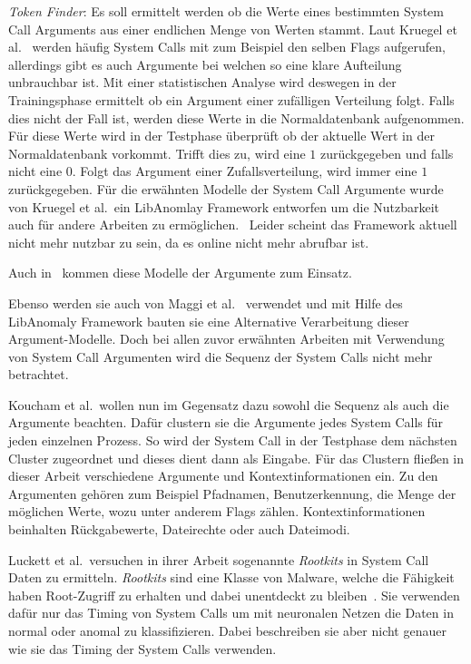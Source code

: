         \textit{Token Finder}: Es soll ermittelt werden ob die Werte eines bestimmten System Call Arguments aus einer endlichen Menge von Werten stammt.
        Laut Kruegel et al.~\cite{ARGUMENTS} werden häufig System Calls mit zum Beispiel den selben Flags aufgerufen, allerdings gibt es auch Argumente bei welchen so eine klare Aufteilung unbrauchbar ist.
        Mit einer statistischen Analyse wird deswegen in der Trainingsphase ermittelt ob ein Argument einer zufälligen Verteilung folgt.
        Falls dies nicht der Fall ist, werden diese Werte in die Normaldatenbank aufgenommen.
        Für diese Werte wird in der Testphase überprüft ob der aktuelle Wert in der Normaldatenbank vorkommt.
        Trifft dies zu, wird eine $1$ zurückgegeben und falls nicht eine $0$.
        Folgt das Argument einer Zufallsverteilung, wird immer eine $1$ zurückgegeben.
        Für die erwähnten Modelle der System Call Argumente wurde von Kruegel et al.\ ein LibAnomlay Framework entworfen um die Nutzbarkeit auch für andere Arbeiten zu ermöglichen.~\cite{ARGUMENTS}
        Leider scheint das Framework aktuell nicht mehr nutzbar zu sein, da es online nicht mehr abrufbar ist.

        Auch in~\cite{ARGUMENTS2} kommen diese Modelle der Argumente zum Einsatz.
        
        Ebenso werden sie auch von Maggi et al.~\cite{MAGGI} verwendet und mit Hilfe des LibAnomaly Framework bauten sie eine Alternative Verarbeitung dieser Argument-Modelle.
        Doch bei allen zuvor erwähnten Arbeiten mit Verwendung von System Call Argumenten wird die Sequenz der System Calls nicht mehr betrachtet.

        Koucham et al.\ wollen nun im Gegensatz dazu sowohl die Sequenz als auch die Argumente beachten.
        Dafür clustern sie die Argumente jedes System Calls für jeden einzelnen Prozess.
        So wird der System Call in der Testphase dem nächsten Cluster zugeordnet und dieses dient dann als Eingabe.
        Für das Clustern fließen in dieser Arbeit verschiedene Argumente und Kontextinformationen ein.
        Zu den Argumenten gehören zum Beispiel Pfadnamen, Benutzerkennung, die Menge der möglichen Werte, wozu unter anderem Flags zählen.
        Kontextinformationen beinhalten Rückgabewerte, Dateirechte oder auch Dateimodi.~\cite{ARGUMENTCLUSTERKOUCHAM2015}

        Luckett et al.\ versuchen in ihrer Arbeit sogenannte \textit{Rootkits} in System Call Daten zu ermitteln.
        \textit{Rootkits} sind eine Klasse von Malware, welche die Fähigkeit haben Root-Zugriff zu erhalten und dabei unentdeckt zu bleiben~\cite{OSSECBRAY2008}.
        Sie verwenden dafür nur das Timing von System Calls um mit neuronalen Netzen die Daten in normal oder anomal zu klassifizieren.
        Dabei beschreiben sie aber nicht genauer wie sie das Timing der System Calls verwenden.~\cite{TIMINGLUCKETT2016}

